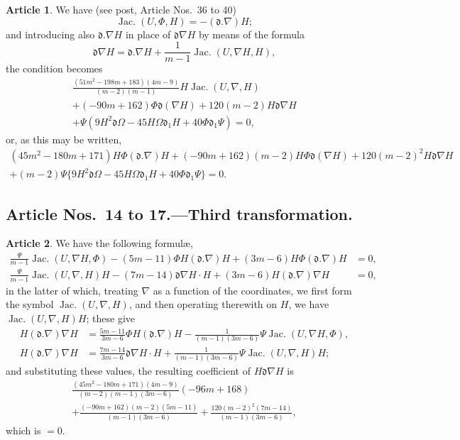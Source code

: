\documentclass[12pt,a4paper]{article}
\theoremstyle{definition}
\newtheorem{art}{Article}[section]
\DeclareMathOperator{\Jac}{Jac.}
\begin{document}
\begin{art}
We have (see post, Article Nos.\ 36 to 40)
\[
\Jac(U, \Phi, H) = -(\mathfrak{d}.\nabla)H;
\]
and introducing also $\mathfrak{d}.\nabla H$ in place of $\mathfrak{d}\nabla H$ by means of the formula
\[
\mathfrak{d}\nabla H = \mathfrak{d}.\nabla H + \frac{1}{m - 1}\Jac(U, \nabla H, H),
\]
the condition becomes
\begin{multline*}
\frac{(51m^2 - 198m + 183)(4m - 9)}{(m - 2)(m - 1)}H\Jac(U, \nabla, H) \\
+ (-90m + 162)\Phi\mathfrak{d}(\nabla H) + 120(m - 2)H\mathfrak{d}\nabla H \\
+ \Psi(9H^2\mathfrak{d}\Omega - 45H\Omega\mathfrak{d}_1 H + 40\Phi\mathfrak{d}_1\Psi) = 0,
\end{multline*}
or, as this may be written,
\begin{multline*}
(45m^2 - 180m + 171)H\Phi(\mathfrak{d}.\nabla)H + (-90m + 162)(m - 2)H\Phi\mathfrak{d}(\nabla H) + 120(m - 2)^2H\mathfrak{d}\nabla H \\
+ (m - 2)\Psi\{9H^2\mathfrak{d}\Omega - 45H\Omega\mathfrak{d}_1 H + 40\Phi\mathfrak{d}_1\Psi\} = 0.
\end{multline*}
\end{art}

\subsection*{Article Nos.\ 14 to 17.---Third transformation.}

\begin{art}
We have the following formul\ae,
\begin{align*}
\frac{\Psi}{m - 1}\Jac(U, \nabla H, \Phi) - (5m - 11)\Phi H(\mathfrak{d}.\nabla)H + (3m - 6)H\Phi(\mathfrak{d}.\nabla)H &= 0, \tag{J} \\
\frac{\Psi}{m - 1}\Jac(U, \nabla, H)H - (7m - 14)\mathfrak{d}\nabla H \cdot H + (3m - 6)H(\mathfrak{d}.\nabla)\nabla H &= 0, \tag{J}
\end{align*}
in the latter of which, treating $\nabla$ as a function of the coordinates, we first form the symbol $\Jac(U, \nabla, H)$, and then operating therewith on $H$, we have $\Jac(U, \nabla, H)H$; these give
\begin{align*}
H(\mathfrak{d}.\nabla)\nabla H &= \frac{5m - 11}{3m - 6}\Phi H(\mathfrak{d}.\nabla)H - \frac{1}{(m - 1)(3m - 6)}\Psi\Jac(U, \nabla H, \Phi), \\
H(\mathfrak{d}.\nabla)\nabla H &= \frac{7m - 14}{3m - 6}\mathfrak{d}\nabla H \cdot H + \frac{1}{(m - 1)(3m - 6)}\Psi\Jac(U, \nabla, H)H;
\end{align*}
and substituting these values, the resulting coefficient of $H\mathfrak{d}\nabla H$ is
\begin{multline*}
\frac{(45m^2 - 180m + 171)(4m - 9)}{(m - 2)(m - 1)(3m - 6)}(-96m + 168) \\
+ \frac{(-90m + 162)(m - 2)(5m - 11)}{(m - 1)(3m - 6)} + \frac{120(m - 2)^2(7m - 14)}{(m - 1)(3m - 6)},
\end{multline*}
which is $= 0$.
\end{art}
\end{document}
